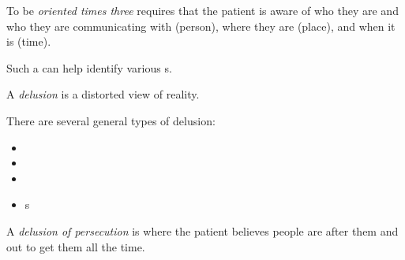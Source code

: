 \begin{definition}\label{def:Oriented_Times_Three}
  To be \emph{oriented times three} requires that the patient is aware of who they are and who they are communicating with (person), where they are (place), and when it is (time).
\end{definition}

Such a  can help identify various s.

\begin{definition}[Delusion]\label{def:Delusion}
  A \emph{delusion} is a distorted view of reality.

  There are several general types of delusion:
  \begin{itemize}[noitemsep]
  \item {}
  \item {}
  \item {}
  \item {}s
  \end{itemize}
\end{definition}

\begin{definition}\label{def:Delusion_of_Persecution}
  A \emph{delusion of persecution} is where the patient believes people are after them and out to get them all the time.
\end{definition}


